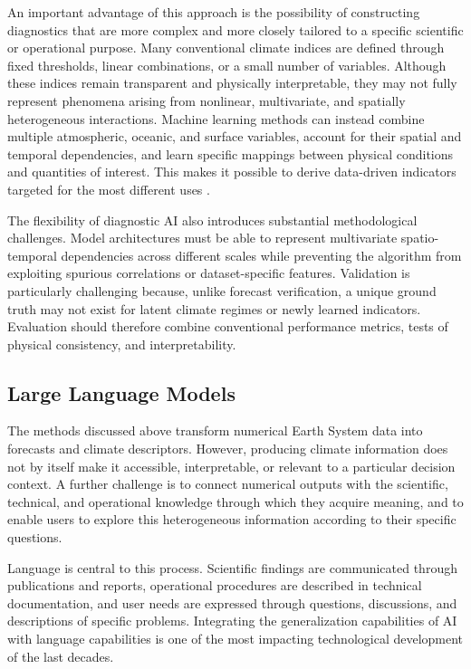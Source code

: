 An important advantage of this approach is the possibility of constructing diagnostics that are more complex and more closely tailored to a specific scientific or operational purpose. Many conventional climate indices are defined through fixed thresholds, linear combinations, or a small number of variables. Although these indices remain transparent and physically interpretable, they may not fully represent phenomena arising from nonlinear, multivariate, and spatially heterogeneous interactions. Machine learning methods can instead combine multiple atmospheric, oceanic, and surface variables, account for their spatial and temporal dependencies, and learn specific mappings between physical conditions and quantities of interest. This makes it possible to derive data-driven indicators targeted for the most different uses \citep{molina_review_2023}.

The flexibility of diagnostic AI also introduces substantial methodological challenges. Model architectures must be able to represent multivariate spatio-temporal dependencies across different scales while preventing the algorithm from exploiting spurious correlations or dataset-specific features. Validation is particularly challenging because, unlike forecast verification, a unique ground truth may not exist for latent climate regimes or newly learned indicators. Evaluation should therefore combine conventional performance metrics, tests of physical consistency, and interpretability. 

 
\subsection{Large Language Models}

The methods discussed above transform numerical Earth System data into forecasts and climate descriptors. However, producing climate information does not by itself make it accessible, interpretable, or relevant to a particular decision context. A further challenge is to connect numerical outputs with the scientific, technical, and operational knowledge through which they acquire meaning, and to enable users to explore this heterogeneous information according to their specific questions.

Language is central to this process. Scientific findings are communicated through publications and reports, operational procedures are described in technical documentation, and user needs are expressed through questions, discussions, and descriptions of specific problems. Integrating the generalization capabilities of AI with language capabilities is one of the most impacting technological development of the last decades.

